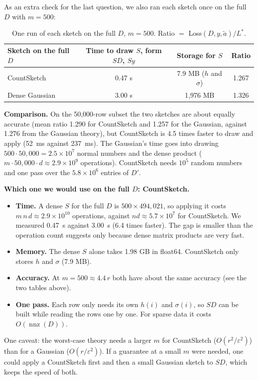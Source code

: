 As an extra check for the last question, we also ran each sketch once on the full $D$ with $m = 500$:

\begin{table}[H]
\centering
\small
\begin{tabular}{lccc}
\toprule
Sketch on the full $D$ & Time to draw $S$, form $SD$, $Sy$ & Storage for $S$ & Ratio \\
\midrule
CountSketch & 0.47 s & 7.9 MB ($h$ and $\sigma$) & 1.267 \\
Dense Gaussian & 3.00 s & 1{,}976 MB & 1.326 \\
\bottomrule
\end{tabular}
\caption{One run of each sketch on the full $D$, $m = 500$. Ratio $=$ Loss$(D,y,\tilde a)/L^*$.}
\end{table}

\textbf{Comparison.} On the 50{,}000-row subset the two sketches are about equally accurate (mean ratio
1.290 for CountSketch and 1.257 for the Gaussian, against 1.276 from the Gaussian theory), but
CountSketch is 4.5 times faster to draw and apply (52~ms against 237~ms). The Gaussian's
time goes into drawing $500 \cdot 50{,}000 = 2.5\times10^7$ normal numbers and the dense product
($m \cdot 50{,}000 \cdot d \approx 2.9\times10^9$ operations). CountSketch needs $10^5$ random numbers and one
pass over the $5.8\times10^6$ entries of $D'$.

\textbf{Which one we would use on the full $D$: CountSketch.}
\begin{itemize}
    \item \textbf{Time.} A dense $S$ for the full $D$ is $500 \times 494{,}021$, so applying it costs
    $m\,n\,d \approx 2.9\times10^{10}$ operations, against $nd \approx 5.7\times10^7$ for CountSketch. We measured
    0.47~s against 3.00~s (6.4 times faster). The gap is smaller than the operation count
    suggests only because dense matrix products are very fast.
    \item \textbf{Memory.} The dense $S$ alone takes 1.98 GB in float64. CountSketch only stores $h$ and
    $\sigma$ (7.9 MB).
    \item \textbf{Accuracy.} At $m = 500 \approx 4.4\,r$ both have about the same accuracy (see the two
    tables above).
    \item \textbf{One pass.} Each row only needs its own $h(i)$ and $\sigma(i)$, so $SD$ can be built while
    reading the rows one by one. For sparse data it costs $O(\operatorname{nnz}(D))$.
\end{itemize}
One caveat: the worst-case theory needs a larger $m$ for CountSketch ($O(r^2/\varepsilon^2)$) than for a
Gaussian ($O(r/\varepsilon^2)$). If a guarantee at a small $m$ were needed, one could apply a CountSketch first
and then a small Gaussian sketch to $SD$, which keeps the speed of both.

